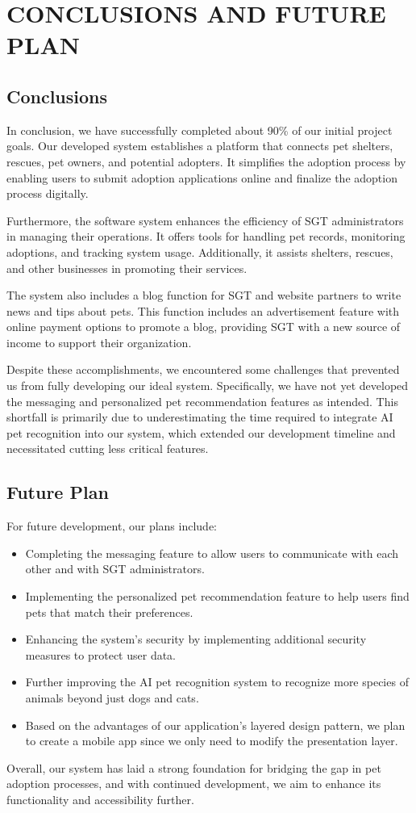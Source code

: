 \chapter{CONCLUSIONS AND FUTURE PLAN}

\section{Conclusions}
In conclusion, we have successfully completed about 90\% of our initial project goals. Our developed system establishes a platform that connects pet shelters, rescues, pet owners, and potential adopters. It simplifies the adoption process by enabling users to submit adoption applications online and finalize the adoption process digitally.

Furthermore, the software system enhances the efficiency of SGT administrators in managing their operations. It offers tools for handling pet records, monitoring adoptions, and tracking system usage. Additionally, it assists shelters, rescues, and other businesses in promoting their services.

The system also includes a blog function for SGT and website partners to write news and tips about pets. This function includes an advertisement feature with online payment options to promote a blog, providing SGT with a new source of income to support their organization.

Despite these accomplishments, we encountered some challenges that prevented us from fully developing our ideal system. Specifically, we have not yet developed the messaging and personalized pet recommendation features as intended. This shortfall is primarily due to underestimating the time required to integrate AI pet recognition into our system, which extended our development timeline and necessitated cutting less critical features.

\section{Future Plan}
For future development, our plans include:

\begin{itemize}
    \item Completing the messaging feature to allow users to communicate with each other and with SGT administrators.
    \item Implementing the personalized pet recommendation feature to help users find pets that match their preferences.
    \item Enhancing the system's security by implementing additional security measures to protect user data.
    \item Further improving the AI pet recognition system to recognize more species of animals beyond just dogs and cats.
    \item Based on the advantages of our application's layered design pattern, we plan to create a mobile app since we only need to modify the presentation layer.
\end{itemize}

Overall, our system has laid a strong foundation for bridging the gap in pet adoption processes, and with continued development, we aim to enhance its functionality and accessibility further.